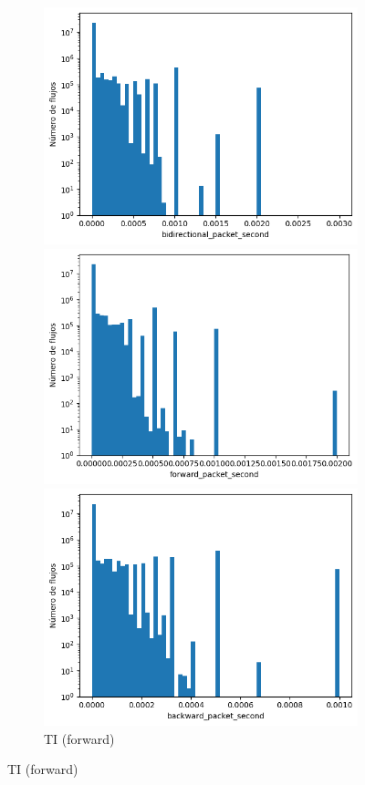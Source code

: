\begin{figure}[H]
\begin{subfigure}[b]{0.26\textwidth}
        \includegraphics[width=\linewidth]{media/packet_pincer_toniot/bidirectional_packet_second_linear_x_log_y.png}
        \caption{TI (bidir.)}
        \includegraphics[width=\textwidth]{media/packet_pincer_toniot/forward_packet_second_linear_x_log_y.png}
        \caption{TI (forward)}
        \includegraphics[width=\textwidth]{media/packet_pincer_toniot/backward_packet_second_linear_x_log_y.png}

\end{subfigure}
\end{figure}
